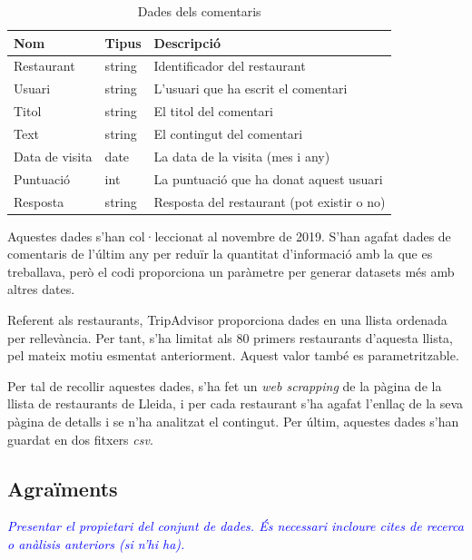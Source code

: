 \documentclass{article}
\newcommand\enunciat[2][blue]{\textcolor{#1}{\emph{#2}}}
\begin{document}
\begin{table}[h]
	\centering
    \begin{tabular}{|p{}|p{}|p{}|}
		\hline
        Nom            & Tipus  & Descripció \\\hline\hline
        Restaurant     & string & Identificador del restaurant\\\hline
        Usuari         & string & L'usuari que ha escrit el comentari \\\hline
        Titol          & string & El titol del comentari \\\hline
        Text           & string & El contingut del comentari \\\hline
        Data de visita & date   & La data de la visita (mes i any) \\\hline
        Puntuació      & int    & La puntuació que ha donat aquest usuari
								  \\\hline
        Resposta       & string & Resposta del restaurant (pot existir o no)
								  \\\hline
    \end{tabular}
    \caption{Dades dels comentaris}
    \label{table:dataset2_data}
\end{table}

Aquestes dades s'han col·leccionat al novembre de 2019. S'han agafat dades de
comentaris de l'últim any per reduïr la quantitat d'informació amb la que es
treballava, però el codi proporciona un paràmetre per generar datasets més
amb altres dates.

Referent als restaurants, TripAdvisor proporciona dades en una llista ordenada
per rellevància. Per tant, s'ha limitat als 80 primers restaurants d'aquesta
llista, pel mateix motiu esmentat anteriorment. Aquest valor també es
parametritzable.
\linebreak

Per tal de recollir aquestes dades, s'ha fet un \textit{web scrapping} de la
pàgina de la llista de restaurants de Lleida, i per cada restaurant s'ha agafat
l'enllaç de la seva pàgina de detalls i se n'ha analitzat el contingut. Per
últim, aquestes dades s'han guardat en dos fitxers \textit{csv}.

\subsection{Agraïments}
\enunciat{Presentar el propietari del conjunt de dades. És necessari incloure
cites de recerca o anàlisis anteriors (si n'hi ha).}
\end{document}
